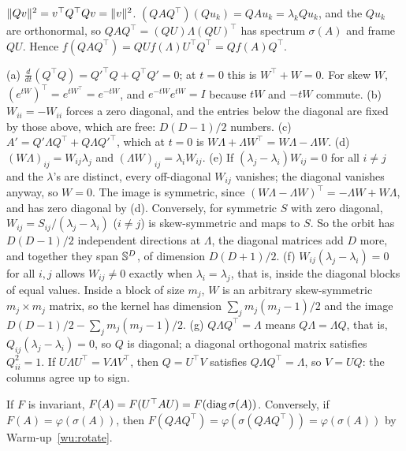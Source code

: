 $\lVert Qv\rVert^2=v^\top Q^\top Qv=\lVert v\rVert^2$. $(QAQ^\top)(Qu_k)=QAu_k=\lambda_kQu_k$, and the $Qu_k$ are orthonormal, so
$QAQ^\top=(QU)\Lambda(QU)^\top$ has spectrum $\sigma(A)$ and frame $QU$. Hence
$f(QAQ^\top)=QUf(\Lambda)U^\top Q^\top=Qf(A)Q^\top$.

(a) $\frac{d}{dt}(Q^\top Q)=Q'^\top Q+Q^\top Q'=0$; at $t=0$ this is $W^\top+W=0$. For skew $W$,
$(e^{tW})^\top=e^{tW^\top}=e^{-tW}$, and $e^{-tW}e^{tW}=I$ because $tW$ and $-tW$ commute.
\newline (b) $W_{ii}=-W_{ii}$ forces a zero diagonal, and the entries below the diagonal are fixed by those above, which are
free: $D(D-1)/2$ numbers.
\newline (c) $A'=Q'\Lambda Q^\top+Q\Lambda Q'^\top$, which at $t=0$ is $W\Lambda+\Lambda W^\top=W\Lambda-\Lambda W$.
\newline (d) $(W\Lambda)_{ij}=W_{ij}\lambda_j$ and $(\Lambda W)_{ij}=\lambda_iW_{ij}$.
\newline (e) If $(\lambda_j-\lambda_i)W_{ij}=0$ for all $i\ne j$ and the $\lambda$'s are distinct, every off-diagonal $W_{ij}$
vanishes; the diagonal vanishes anyway, so $W=0$. The image is symmetric, since
$(W\Lambda-\Lambda W)^\top=-\Lambda W+W\Lambda$, and has zero diagonal by (d). Conversely, for symmetric $S$ with zero
diagonal, $W_{ij}=S_{ij}/(\lambda_j-\lambda_i)$ ($i\ne j$) is skew-symmetric and maps to $S$. So the orbit has
$D(D-1)/2$ independent directions at $\Lambda$, the diagonal matrices add $D$ more, and together they span $\mathbb{S}^D$,
of dimension $D(D+1)/2$.
\newline (f) $W_{ij}(\lambda_j-\lambda_i)=0$ for all $i,j$ allows $W_{ij}\ne0$ exactly when $\lambda_i=\lambda_j$, that is,
inside the diagonal blocks of equal values. Inside a block of size $m_j$, $W$ is an arbitrary skew-symmetric
$m_j\times m_j$ matrix, so the kernel has dimension $\sum_jm_j(m_j-1)/2$ and the image $D(D-1)/2-\sum_jm_j(m_j-1)/2$.
\newline (g) $Q\Lambda Q^\top=\Lambda$ means $Q\Lambda=\Lambda Q$, that is, $Q_{ij}(\lambda_j-\lambda_i)=0$, so $Q$ is
diagonal; a diagonal orthogonal matrix satisfies $Q_{ii}^2=1$. If $U\Lambda U^\top=V\Lambda V^\top$, then
$Q=U^\top V$ satisfies $Q\Lambda Q^\top=\Lambda$, so $V=UQ$: the columns agree up to sign.

If $F$ is invariant, $F(A)=F(U^\top AU)=F(\operatorname{diag}\sigma(A))$. Conversely, if $F(A)=\varphi(\sigma(A))$, then
$F(QAQ^\top)=\varphi(\sigma(QAQ^\top))=\varphi(\sigma(A))$ by Warm-up~\ref{wu:rotate}.

